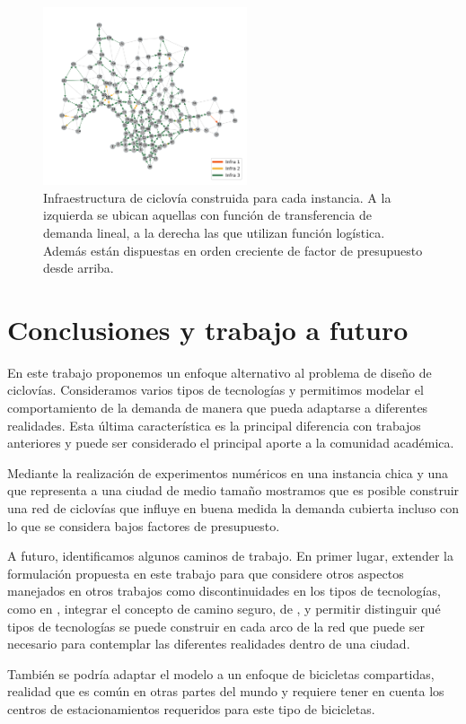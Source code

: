 \documentclass{article}
\begin{document}
\begin{figure}[h!]
    \includegraphics[width=6cm]{../resources/montevideo_d5000.0_inv_logit_1.6_budget_factor.png}
    \caption{Infraestructura de ciclovía construida para cada instancia. A la izquierda se ubican aquellas con función de transferencia de demanda lineal, a la derecha las que utilizan función logística. Además están dispuestas en orden creciente de factor de presupuesto desde arriba.}
    \label{fig:montevideo_instances_infras}
  \end{figure}

  \section{Conclusiones y trabajo a futuro}

  En este trabajo proponemos un enfoque alternativo al problema de diseño de ciclovías. Consideramos varios tipos de tecnologías y permitimos modelar el comportamiento de la demanda de manera que pueda adaptarse a diferentes realidades. Esta última característica es la principal diferencia con trabajos anteriores y puede ser considerado el principal aporte a la comunidad académica.

  Mediante la realización de experimentos numéricos en una instancia chica y una que representa a una ciudad de medio tamaño mostramos que es posible construir una red de ciclovías que influye en buena medida la demanda cubierta incluso con lo que se considera bajos factores de presupuesto.

  A futuro, identificamos algunos caminos de trabajo. En primer lugar, extender la formulación propuesta en este trabajo para que considere otros aspectos manejados en otros trabajos como discontinuidades en los tipos de tecnologías, como en \cite{baya2021}, integrar el concepto de camino seguro, de \cite{lim2021}, y permitir distinguir qué tipos de tecnologías se puede construir en cada arco de la red que puede ser necesario para contemplar las diferentes realidades dentro de una ciudad.

  También se podría adaptar el modelo a un enfoque de bicicletas compartidas, realidad que es común en otras partes del mundo y requiere tener en cuenta los centros de estacionamientos requeridos para este tipo de bicicletas.
\end{document}

